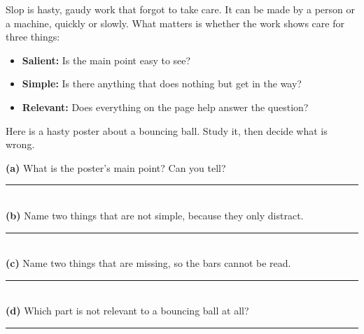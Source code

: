 \clearpage
\thispagestyle{fancy}\label{slop}
Slop is hasty, gaudy work that forgot to take care. It can be made by a person or a machine, quickly or slowly. What matters is whether the work shows care for three things:
\begin{itemize}[leftmargin=1.6em]
\item \textbf{Salient:} Is the main point easy to see?
\item \textbf{Simple:} Is there anything that does nothing but get in the way?
\item \textbf{Relevant:} Does everything on the page help answer the question?
\end{itemize}

Here is a hasty poster about a bouncing ball. Study it, then decide what is wrong.

\begin{center}
\end{center}

\begin{slopbox}
\textbf{(a)} What is the poster's main point? Can you tell?\\[3pt]\rule{\linewidth}{0.5pt}\\[6pt]
\textbf{(b)} Name two things that are not simple, because they only distract.\\[3pt]\rule{\linewidth}{0.5pt}\\[6pt]
\textbf{(c)} Name two things that are missing, so the bars cannot be read.\\[3pt]\rule{\linewidth}{0.5pt}\\[6pt]
\textbf{(d)} Which part is not relevant to a bouncing ball at all?\\[3pt]\rule{\linewidth}{0.5pt}
\end{slopbox}

